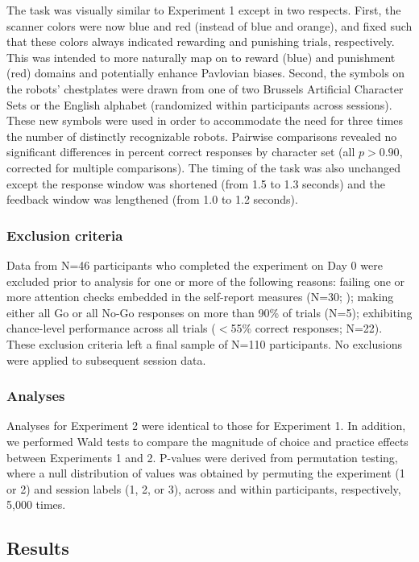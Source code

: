 \documentclass[a4paper,12pt]{article}
\begin{document}
\begin{refsection}[main]
The task was visually similar to Experiment 1 except in two respects. First, the scanner colors were now blue and red (instead of blue and orange), and fixed such that these colors always indicated rewarding and punishing trials, respectively. This was intended to more naturally map on to reward (blue) and punishment (red) domains and potentially enhance Pavlovian biases. Second, the symbols on the robots' chestplates were drawn from one of two Brussels Artificial Character Sets \cite{vidal2017bacs} or the English alphabet (randomized within participants across sessions). These new symbols were used in order to accommodate the need for three times the number of distinctly recognizable robots. Pairwise comparisons revealed no significant differences in percent correct responses by character set (all $p > 0.90$, corrected for multiple comparisons). The timing of the task was also unchanged except the response window was shortened (from 1.5 to 1.3 seconds) and the feedback window was lengthened (from 1.0 to 1.2 seconds). 

\subsubsection*{Exclusion criteria}

Data from N=46 participants who completed the experiment on Day 0 were excluded prior to analysis for one or more of the following reasons: failing one or more attention checks embedded in the self-report measures (N=30; \cite{zorowitz2023inattentive}); making either all Go or all No-Go responses on more than 90\% of trials (N=5); exhibiting chance-level performance across all trials ($<$55\% correct responses; N=22). These exclusion criteria left a final sample of N=110 participants. No exclusions were applied to subsequent session data. 

\subsubsection*{Analyses}

Analyses for Experiment 2 were identical to those for Experiment 1. In addition, we performed Wald tests to compare the magnitude of choice and practice effects between Experiments 1 and 2. P-values were derived from permutation testing, where a null distribution of values was obtained by permuting the experiment (1 or 2) and session labels (1, 2, or 3), across and within participants, respectively, 5,000 times.

\subsection*{Results}


\end{refsection}
\end{document}
